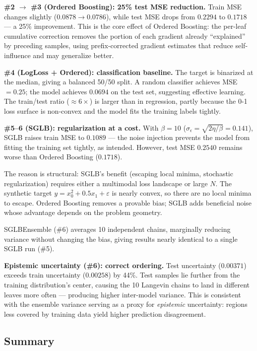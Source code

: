 \documentclass[11pt, a4paper]{article}
\begin{document}
\textbf{\#2 $\to$ \#3 (Ordered Boosting): 25\% test MSE reduction.}
Train MSE changes slightly ($0.0878 \to 0.0786$), while test MSE
drops from $0.2294$ to $0.1718$ --- a 25\% improvement.
This is the core effect of Ordered Boosting: the per-leaf cumulative
correction removes the portion of each gradient already ``explained''
by preceding samples, using prefix-corrected gradient estimates that
reduce self-influence and may generalize better.

\textbf{\#4 (LogLoss + Ordered): classification baseline.}
The target is binarized at the median, giving a balanced 50/50 split.
A random classifier achieves MSE $= 0.25$; the model achieves
$0.0694$ on the test set, suggesting effective learning.
The train/test ratio ($\approx 6\times$) is larger than in regression,
partly because the 0-1 loss surface is non-convex and the model
fits the training labels tightly.

\textbf{\#5--6 (SGLB): regularization at a cost.}
With $\beta = 10$ ($\sigma_\epsilon = \sqrt{2\eta/\beta} = 0.141$),
SGLB raises train MSE to $0.1089$ --- the noise injection prevents
the model from fitting the training set tightly, as intended.
However, test MSE $0.2540$ remains worse than Ordered Boosting ($0.1718$).

The reason is structural: SGLB's benefit (escaping local minima,
stochastic regularization) requires either a multimodal loss landscape
or large $N$. The synthetic target $y = x_0^2 + 0.5x_1 + \varepsilon$
is nearly convex, so there are no local minima to escape.
Ordered Boosting removes a provable bias; SGLB adds beneficial noise
whose advantage depends on the problem geometry.

SGLBEnsemble (\#6) averages 10 independent chains, marginally
reducing variance without changing the bias, giving results nearly
identical to a single SGLB run (\#5).

\textbf{Epistemic uncertainty (\#6): correct ordering.}
Test uncertainty ($0.00371$) exceeds train uncertainty ($0.00258$)
by 44\%.
Test samples lie further from the training distribution's center,
causing the 10 Langevin chains to land in different leaves more often
--- producing higher inter-model variance.
This is consistent with the ensemble variance serving as a proxy for
\emph{epistemic} uncertainty: regions less covered by training data
yield higher prediction disagreement.

\subsection{Summary}
\end{document}
